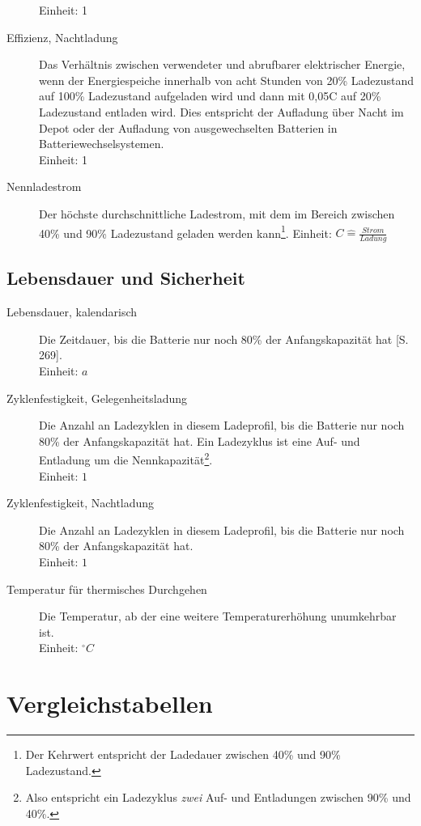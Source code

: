 \begin{description}
	Einheit: 1
	\item[Effizienz, Nachtladung] Das Verhältnis zwischen verwendeter und abrufbarer elektrischer Energie, wenn der Energiespeiche innerhalb von acht Stunden von 20\% Ladezustand auf 100\% Ladezustand aufgeladen wird und dann mit 0,05C auf 20\% Ladezustand entladen wird. Dies entspricht der Aufladung über Nacht im Depot oder der Aufladung von ausgewechselten Batterien in Batteriewechselsystemen.\\
	Einheit: 1
	\item[Nennladestrom] Der höchste durchschnittliche Ladestrom, mit dem im Bereich zwischen 40\% und 90\% Ladezustand geladen werden kann\footnote{Der Kehrwert entspricht der Ladedauer zwischen 40\% und 90\% Ladezustand.}.
	Einheit: $C\hat{=} \frac{Strom}{Ladung}$
\end{description}

\subsection{Lebensdauer und Sicherheit}
\begin{description}
	\item[Lebensdauer, kalendarisch] Die Zeitdauer, bis die Batterie nur noch 80\% der Anfangskapazität hat \cite{Sterner:2014}[S. 269]. \\
	Einheit: $a$
	\item[Zyklenfestigkeit, Gelegenheitsladung] Die Anzahl an Ladezyklen in diesem Ladeprofil, bis die Batterie nur noch 80\% der Anfangskapazität hat. Ein Ladezyklus ist eine Auf- und Entladung um die Nennkapazität\footnote{Also entspricht ein Ladezyklus \emph{zwei} Auf- und Entladungen zwischen 90\% und 40\%.}.\\
	Einheit: $1$
	\item[Zyklenfestigkeit, Nachtladung] Die Anzahl an Ladezyklen in diesem Ladeprofil, bis die Batterie nur noch 80\% der Anfangskapazität hat.\\
	Einheit: $1$
	\item[Temperatur für thermisches Durchgehen] Die Temperatur, ab der eine weitere Temperaturerhöhung unumkehrbar ist.\\
	Einheit: $^\circ C$
\end{description}


\section{Vergleichstabellen}
\label{vergleichstabellen_speichertechnologien}
